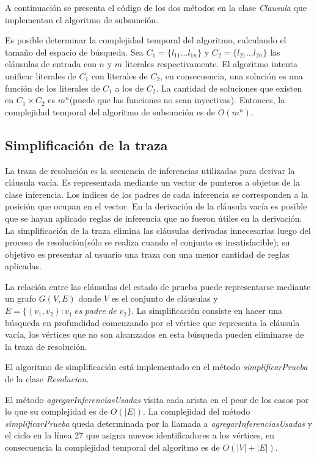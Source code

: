 \documentclass[a4paper,12pt]{article}
\begin{document}
A continuación se presenta el código de los dos métodos en la clase \emph{Clausula} que implementan
el algoritmo de subsunción.


Es posible determinar la complejidad temporal del algoritmo, calculando el tamaño del espacio de búsqueda.
Sea $C_1 = \{l_{11}...l_{1n}\}$ y $C_2 = \{l_{21}...l_{2n}\}$ las cláusulas de entrada con $n$ y $m$ literales respectivamente. 
El algoritmo intenta unificar literales de $C_1$ con literales de $C_2$, en consecuencia, una solución es una función
de los literales de $C_1$ a los de $C_2$. La cantidad de soluciones que existen en $C_1 \times C_2$ es $m^n$(puede que las funciones no sean inyectivas).
Entonces, la complejidad temporal del algoritmo de subsunción es de $O(m^n)$.
\subsection{Simplificación de la traza}
La traza de resolución es la secuencia de inferencias utilizadas para derivar la cláusula vacía. Es representada
mediante un vector de punteros a objetos de la clase inferencia. Los índices de los padres de cada inferencia
se corresponden a la posición que ocupan en el vector. En la derivación de la cláusula vacía es posible
que se hayan aplicado reglas de inferencia que no fueron útiles en la derivación. La simplificación de la traza
elimina las cláusulas derivadas innecesarias luego del proceso de resolución(sólo se realiza cuando el conjunto es insatisfacible);
su objetivo es presentar al usuario una traza con una menor cantidad de reglas aplicadas.

La relación entre las cláusulas del estado de prueba puede representarse mediante un grafo $G(V,E)$ donde $V$
es el conjunto de cláusulas y $E = \{(v_1,v_2) : v_1\;es\;padre\;de\;v_2\}$. La simplificación consiste en hacer
una búsqueda en profundidad comenzando por el vértice que representa la cláusula vacía, los vértices que no son
alcanzados en esta búsqueda pueden eliminarse de la traza de resolución.

El algoritmo de simplificación está implementado en el método \emph{simplificarPrueba} de la clase \emph{Resolucion}.

El método \emph{agregarInferenciasUsadas} visita cada arista en el peor de los casos por lo que su complejidad es de $O(\left|E\right|)$.
La complejidad del método \emph{simplificarPrueba} queda determinada por la llamada a \emph{agregarInferenciasUsadas} y el ciclo en la línea
27 que asigna nuevos identificadores a los vértices, en consecuencia la complejidad temporal del algoritmo es de $O(\left|V\right|+\left|E\right|)$.
\end{document}
